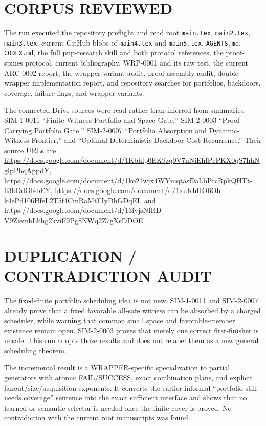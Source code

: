 \documentclass[11pt]{article}
\begin{document}
\section*{CORPUS REVIEWED}
The run executed the repository preflight and read root \texttt{main.tex},
\texttt{main2.tex}, \texttt{main3.tex}, current GitHub blobs of
\texttt{main4.tex} and \texttt{main5.tex}, \texttt{AGENTS.md},
\texttt{CODEX.md}, the full pnp-research skill and both protocol references,
the proof-spines protocol, current bibliography, WRP-0001 and its raw test,
the current ARC-0002 report, the wrapper-variant audit, proof-assembly audit,
double-wrapper implementation report, and repository searches for portfolios,
backdoors, coverage, failure flags, and wrapper variants.

The connected Drive sources were read rather than inferred from summaries:
SIM-1-0011 ``Finite-Witness Portfolio and Space Gate,'' SIM-2-0003
``Proof-Carrying Portfolio Gate,'' SIM-2-0007 ``Portfolio Absorption and
Dynamic-Witness Frontier,'' and ``Optimal Deterministic Backdoor-Cost
Recurrence.''  Their source URLs are
\url{https://docs.google.com/document/d/1Kbhlp0EK9zq0V7nNiEhfPcPKX0qS7hhNglpPbqAppdY},
\url{https://docs.google.com/document/d/1ko21wjx4WYmqtasf9aLbPtcRpkQHTt-fi3bDdOl4bEY},
\url{https://docs.google.com/document/d/1xuKhHO6Oh-k4ePd106HfeL2T5f4CmRaMtFIyDhGDqEI}, and
\url{https://docs.google.com/document/d/13fvjsNfRD-V9ZiembLbhg2kviF9Pg8NWq2Z7gXsDDOE}.

\section*{DUPLICATION / CONTRADICTION AUDIT}
The fixed-finite portfolio scheduling idea is not new.  SIM-1-0011 and
SIM-2-0007 already prove that a fixed favorable all-safe witness can be
absorbed by a charged scheduler, while warning that common small space and
favorable-member existence remain open.  SIM-2-0003 proves that merely one
correct first-finisher is unsafe.  This run adopts those results and does not
relabel them as a new general scheduling theorem.

The incremental result is a WRAPPER-specific specialization to partial
generators with atomic FAIL/SUCCESS, exact combination plans, and explicit
fanout/size/acquisition exponents.  It converts the earlier informal
``portfolio still needs coverage'' sentence into the exact sufficient
interface and shows that no learned or semantic selector is needed once the
finite cover is proved.  No contradiction with the current root manuscripts
was found.
\end{document}
